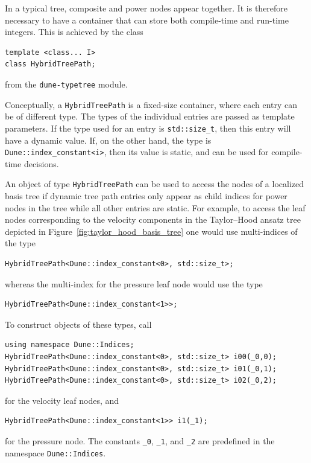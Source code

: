 \documentclass[a4paper,10pt,headings=normal,bibliography=totoc]{scrartcl}
\newcommand{\cpp}[1]{\lstinline[basicstyle=\ttfamily]!#1!}
\newcommand{\dunemodule}[1]{\texttt{#1}}
\begin{document}
In a typical tree, composite and power nodes appear together.  It is therefore
necessary to have a container that can store both compile-time and run-time integers.
This is achieved by the class
%
\begin{lstlisting}[style=Interface]
template <class... I>
class HybridTreePath;
\end{lstlisting}
%
from the \dunemodule{dune-typetree} module.

Conceptually, a \cpp{HybridTreePath} is a fixed-size container, where each entry
can be of different type. The types of the individual entries
are passed as template parameters. If the type used for an entry is
\cpp{std::size_t}, then this entry will have a dynamic value.
If, on the other hand, the type is \cpp{Dune::index_constant<i>}, then its value is static,
and can be used for compile-time decisions.

An object of type \cpp{HybridTreePath} can be used to access the nodes of a
localized basis tree if dynamic tree path entries only appear as child indices
for power nodes in the tree while all other entries are static.
For example, to access the leaf nodes corresponding
to the velocity components in the Taylor--Hood ansatz tree depicted
in Figure~\ref{fig:taylor_hood_basis_tree} one would use multi-indices
of the type
\begin{lstlisting}[style=Example]
HybridTreePath<Dune::index_constant<0>, std::size_t>;
\end{lstlisting}
whereas the multi-index for the pressure leaf node would use the type
\begin{lstlisting}[style=Example]
HybridTreePath<Dune::index_constant<1>>;
\end{lstlisting}
To construct objects of these types, call
\begin{lstlisting}[style=Example]
using namespace Dune::Indices;
HybridTreePath<Dune::index_constant<0>, std::size_t> i00(_0,0);
HybridTreePath<Dune::index_constant<0>, std::size_t> i01(_0,1);
HybridTreePath<Dune::index_constant<0>, std::size_t> i02(_0,2);
\end{lstlisting}
for the velocity leaf nodes, and
\begin{lstlisting}[style=Example]
HybridTreePath<Dune::index_constant<1>> i1(_1);
\end{lstlisting}
for the pressure node.  The constants \cpp{_0}, \cpp{_1}, and \cpp{_2}
are predefined in the namespace \cpp{Dune::Indices}.
\end{document}
